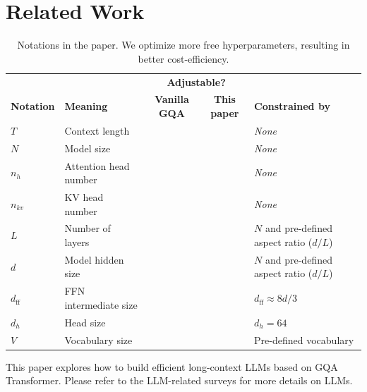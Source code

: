 \documentclass[11pt]{article}
\newcommand{\cmark}{\textcolor{green!60!black}{\ding{51}}} %
\newcommand{\xmark}{\textcolor{red}{\ding{55}}}            %
\begin{document}
\section{Related Work}
\label{sec:related-work}

\begin{table}[t]
    \centering
    \footnotesize
    \begin{tabular}{l|l|cc|l}
        \toprule
        & & \multicolumn{2}{c|}{\textbf{Adjustable?}} & \\
        \textbf{Notation} & \textbf{Meaning} & \textbf{Vanilla GQA} & \textbf{This paper} & \textbf{Constrained by} \\
        \midrule
        $T$             & Context length & \xmark & \xmark & \textit{None}\\
        \midrule
        $N$     & Model size  & \xmark & \cmark & \textit{None}\\
        $n_h$   & Attention head number  & \xmark & \cmark & \textit{None} \\
        $n_{kv}$      & KV head number & \cmark & \cmark & \textit{None}\\
        \midrule
        $L$             & Number of layers & \xmark & \xmark & $N$ and pre-defined aspect ratio ($d/L$)\\
        $d$             & Model hidden size & \xmark & \xmark & $N$ and pre-defined aspect ratio ($d/L$)\\
        $d_\text{ff}$   & FFN intermediate size & \xmark & \xmark & $d_\text{ff} \approx 8d/3$\\
        $d_h$           & Head size & \xmark & \xmark & $d_h=64$ \\
        $V$   & Vocabulary size & \xmark & \xmark & Pre-defined vocabulary\\
        \bottomrule
    \end{tabular}
    \caption{Notations in the paper. We optimize more free hyperparameters, resulting in better cost-efficiency.}
    \label{tab:notations-short}
\end{table}

This paper explores how to build efficient long-context LLMs based on GQA Transformer. Please refer to the LLM-related surveys \citep{zhao2023survey,lu2024small} for more details on LLMs.
\end{document}
